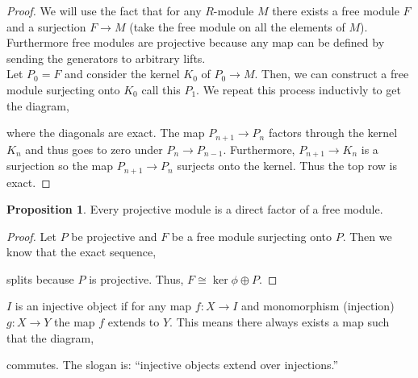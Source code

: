 \documentclass[12pt]{article}
\theoremstyle{remark}
\theoremstyle{definition}
\newtheorem{proposition}[theorem]{Proposition}
\newenvironment{definition}[1][Definition:]{\begin{trivlist}
\item[\hskip \labelsep {\bfseries #1}]}{\end{trivlist}}
\begin{document}
\begin{proof}
We will use the fact that for any $R$-module $M$ there exists a free module $F$ and a surjection $F \to M$ (take the free module on all the elements of $M$). Furthermore free modules are projective because any map can be defined by sending the generators to arbitrary lifts. 
\bigskip\\
Let $P_0 = F$ and consider the kernel $K_0$ of $P_0 \to M$. Then, we can construct a free module surjecting onto $K_0$ call this $P_1$. We repeat this process inductivly to get the diagram,
\begin{center}
\end{center}
where the diagonals are exact. The map $P_{n+1} \to P_n$ factors through the kernel $K_n$ and thus goes to zero under $P_n \to P_{n-1}$. Furthermore, $P_{n+1} \to K_n$ is a surjection so the map $P_{n+1} \to P_n$ surjects onto the kernel. Thus the top row is exact.  
\end{proof}

\begin{proposition}
Every projective module is a direct factor of a free module.
\end{proposition}

\begin{proof}
Let $P$ be projective and $F$ be a free module surjecting onto $P$. Then we know that the exact sequence,
\begin{center}
\end{center}
splits because $P$ is projective. Thus, $F \cong \ker{\phi} \oplus P$. 
\end{proof}

\begin{definition}
$I$ is an injective object if for any map $f : X \to I$ and monomorphism (injection) $g : X \to Y$ the map $f$ extends to $Y$. This means there always exists a map such that the diagram,
\begin{center}
\end{center}
commutes. The slogan is: ``injective objects extend over injections.''
\end{definition}
\end{document}
